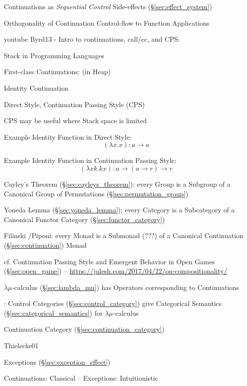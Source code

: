 Continuations as \emph{Sequential Control} Side-effects
(\S\ref{sec:effect_system})

Orthogonality of Continuation Control-flow to Function Applications


\asterism


youtube Byrd13 - Intro to continuations, call/cc, and CPS:

Stack in Programming Languages

First-class Continuations: (in Heap) %

Identity Continuation


\asterism


Direct Style, Continuation Passing Style (CPS)

CPS may be useful where Stack space is limited

Example Identity Function in Direct Style:
\[
  (\lambda x . x) : a \rightarrow a
\]

Example Identity Function in Continuation Passing Style:
\[
  (\lambda x k.k x) : a \rightarrow (a \rightarrow r) \rightarrow r
\]

Cayley's Theorem (\S\ref{sec:cayleys_theorem}): every Group is a
Subgroup of a Canonical Group of Permutations
(\S\ref{sec:permutation_group})

Yoneda Lemma (\S\ref{sec:yoneda_lemma}): every Category is a
Subcategory of a Canonical Functor Category
(\S\ref{sec:functor_category})

Filinski \cite{filinski99}/Piponi: every Monad is a Submonad (???) of
a Canonical Continuation (\S\ref{sec:continuation}) Monad

cf. Continuation Passing Style and Emergent Behavior in Open Games
(\S\ref{sec:open_game}) --
\url{https://julesh.com/2017/04/22/on-compositionality/}


\asterism


$\lambda\mu$-calculus (\S\ref{sec:lambda_mu}) has Operators
corresponding to Continuations

\cite{selinger01}: Control Categories (\S\ref{sec:control_category})
give Categorical Semantics (\S\ref{sec:categorical_semantics}) for
$\lambda\mu$-calculus

Continuation Category (\S\ref{sec:continuation_category})


\asterism


Thielecke01 %

Exceptions (\S\ref{sec:exception_effect})

Continuations: Classical -- Exceptions: Intuitionistic

